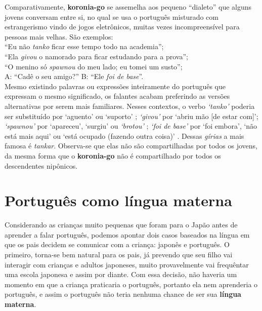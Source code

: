 \documentclass{article}
\newcommand{\keyword}[1]{\textbf{#1}}
\newcommand{\koronia}{\keyword{koronia-go}}
\begin{document}

Comparativamente,
\koronia{} se assemelha aos
pequeno ``dialeto'' que alguns jovens conversam entre si,
no qual se usa o português misturado
com estrangerismo vindo de jogos eletrônicos,
muitas vezes incompreensível para pessoas mais velhas.
São exemplos: \\
``Eu não \emph{tanko} ficar esse tempo todo na academia''; \\
``Ela \emph{givou} o namorado para ficar estudando para a prova''; \\
``O menino só \emph{spawnou} do meu lado; eu tomei um susto''; \\
A: ``Cadê o seu amigo?'' B: ``Ele \emph{foi de base}''. \\
Mesmo existindo palavras ou expressões inteiramente do português
que expressam o mesmo significado,
os falantes acabam preferindo as versões alternativas
por serem mais familiares.
Nesses contextos,
o verbo \emph{`tanko'} poderia ser substituído
por `aguento' ou `suporto'
\cite{tankaruol} \cite{tankarwikti};
\emph{`givou'} por `abriu mão [de estar com]';
\emph{`spawnou'} por `apareceu', `surgiu' ou \emph{`brotou'}
\cite{spawnardicioinf} \cite{spawnarwikti};
\emph{`foi de base'} por `foi embora',
`não está mais aqui' ou `está ocupado (fazendo outra coisa)'
\cite{irdebasehinative} \cite{irdebasewikti} \cite{irdebasedicioinf}.
Dessas \emph{gírias} a mais famosa é \emph{tankar}.
Observa-se que elas não são compartilhadas por todos os jovens,
da mesma forma que o \koronia{} não
é compartilhado por todos os descendentes nipônicos.

\section{Português como língua materna}

Considerando as crianças muito pequenas
que foram para o Japão antes de aprender a falar português,
podemos apontar dois casos
baseados na língua em que
os pais decidem se comunicar com a criança:
japonês e português.
O primeiro, torna-se bem natural para os pais,
já prevendo que seu filho vai interagir com
crianças e adultos japoneses,
muito provavelmente vai frequêntar uma escola japonesa e
assim por diante.
Com essa decisão,
não haveria um momento em que a criança
praticaria o português,
portanto ela nem aprenderia o português,
e assim o português não teria nenhuma chance de
ser sua \keyword{língua materna}.
\end{document}
